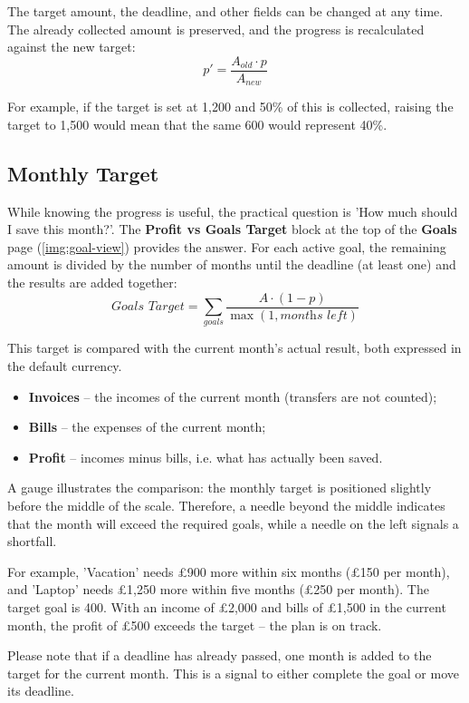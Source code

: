 The target amount, the deadline, and other fields can be changed at any time. The already
collected amount is preserved, and the progress is recalculated against the new target:
\[
  p' = \frac{A_{old} \cdot p}{A_{new}}
\]

\noindent For example, if the target is set at 1,200 and 50\% of this is collected, raising
the target to 1,500 would mean that the same 600 would represent 40\%.


\subsection{Monthly Target}

While knowing the progress is useful, the practical question is 'How much should I save this
month?'. The \textbf{Profit vs Goals Target} block at the top of the \textbf{Goals} page
(\cref{img:goal-view}) provides the answer. For each active goal, the remaining amount is
divided by the number of months until the deadline (at least one) and the results are added
together:
\[
  \textit{Goals Target} = \sum_{goals} \frac{A \cdot (1 - p)}{\max(1, \textit{months left})}
\]

\noindent This target is compared with the current month's actual result, both expressed in
the default currency.

\begin{itemize}
  \item \textbf{Invoices} -- the incomes of the current month (transfers are not counted);
  \item \textbf{Bills} -- the expenses of the current month;
  \item \textbf{Profit} -- incomes minus bills, i.e. what has actually been saved.
\end{itemize}

\noindent A gauge illustrates the comparison: the monthly target is positioned slightly
before the middle of the scale. Therefore, a needle beyond the middle indicates that the
month will exceed the required goals, while a needle on the left signals a shortfall.

For example, 'Vacation' needs £900 more within six months (£150 per month), and 'Laptop'
needs £1,250 more within five months (£250 per month). The target goal is 400. With an income
of £2,000 and bills of £1,500 in the current month, the profit of £500 exceeds the target --
the plan is on track.

Please note that if a deadline has already passed, one month is added to the target for the
current month. This is a signal to either complete the goal or move its deadline.


